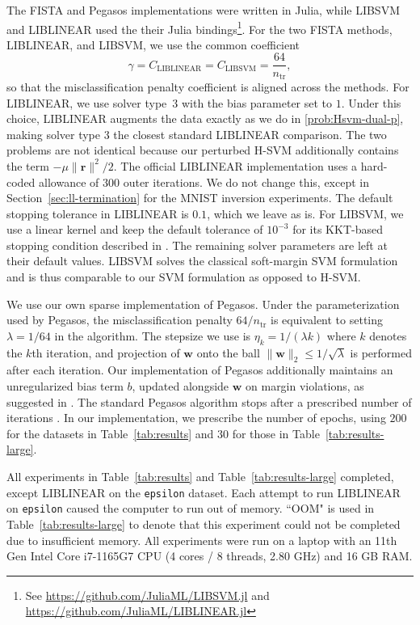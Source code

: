 \documentclass[twoside,11pt]{article}
\renewcommand\r{\bm{r}}
\newcommand\w{\bm{w}}
\begin{document}
The FISTA and Pegasos implementations were written in Julia, while LIBSVM and LIBLINEAR used the their Julia bindings\footnote{See \url{https://github.com/JuliaML/LIBSVM.jl} and \url{https://github.com/JuliaML/LIBLINEAR.jl}}. For the two FISTA methods, LIBLINEAR, and LIBSVM, we use the common coefficient
\[
    \gamma = C_{\mathrm{LIBLINEAR}} = C_{\mathrm{LIBSVM}} = \frac{64}{n_{\mathrm{tr}}},
\]
so that the misclassification penalty coefficient is aligned across the methods. For LIBLINEAR, we use solver type~3 with the bias parameter set to $1$.  Under this choice, LIBLINEAR augments the data exactly as we do in \eqref{prob:Hsvm-dual-p}, making solver type $3$ the closest standard LIBLINEAR comparison. The two problems are not identical because our perturbed H-SVM additionally contains the term $-\mu\|\r\|^2/2$. The official LIBLINEAR implementation uses a hard-coded allowance of $300$ outer iterations. We do not change this, except in Section~\ref{sec:ll-termination} for the MNIST inversion experiments. The default stopping tolerance in LIBLINEAR is $0.1$, which we leave as is. For LIBSVM, we use a linear kernel and keep the default tolerance of $10^{-3}$ for its KKT-based stopping condition described in \cite[Section~4.1.2]{LIBSVM}. The remaining solver parameters are left at their default values. LIBSVM solves the classical soft-margin SVM formulation and is thus comparable to our SVM formulation as opposed to H-SVM.

We use our own sparse implementation of Pegasos. Under the parameterization used by Pegasos, the misclassification penalty $64/n_{\mathrm{tr}}$ is equivalent to setting $\lambda=1/64$ in the algorithm. The stepsize we use is $\eta_k = 1/(\lambda k)$ where $k$ denotes the $k$th iteration, and projection of $\w$ onto the ball $\lVert\w\rVert_2 \leq 1/\sqrt{\lambda}$ is performed after each iteration. Our implementation of Pegasos additionally maintains an unregularized bias term $b$, updated alongside $\w$ on margin violations, as suggested in \citep[Section~6]{Pegasos}. The standard Pegasos algorithm stops after a prescribed number of iterations \citep[Section~2]{Pegasos}. In our implementation, we prescribe the number of epochs, using $200$ for the datasets in Table~\ref{tab:results} and $30$ for those in Table~\ref{tab:results-large}.

All experiments in Table~\ref{tab:results} and Table~\ref{tab:results-large} completed, except LIBLINEAR on the \texttt{epsilon} dataset. Each attempt to run LIBLINEAR on \texttt{epsilon} caused the computer to run out of memory. ``OOM" is used in Table~\ref{tab:results-large} to denote that this experiment could not be completed due to insufficient memory. All experiments were run on a laptop with an 11th Gen Intel Core i7-1165G7 CPU (4 cores / 8 threads, 2.80 GHz) and 16 GB RAM.
\end{document}
